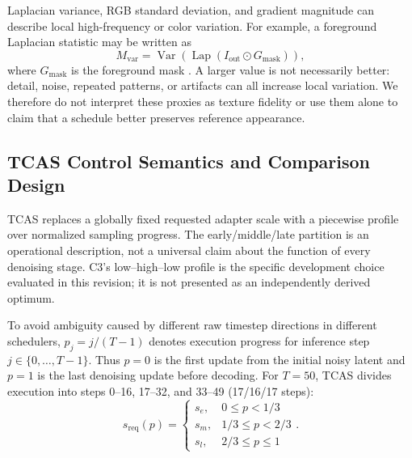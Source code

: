 \documentclass[times,twocolumn,final]{elsarticle}
\providecommand{\DIFadd}[1]{{\protect\color{blue} \sf #1}} %
\providecommand{\DIFaddbegin}{} %
\providecommand{\DIFaddend}{} %
\begin{document}
\DIFaddend Laplacian variance, RGB standard deviation, and gradient magnitude   \DIFaddbegin \DIFadd{can describe local }\DIFaddend high-frequency  
 \DIFaddbegin \DIFadd{or color variation. For example, a foreground Laplacian statistic may be written as
}\begin{equation}
M_{\mathrm{var}}=\operatorname{Var}\!\left(\operatorname{Lap}(I_{\mathrm{out}}\odot G_{\mathrm{mask}})\right),
\end{equation}\DIFaddend 
where   \DIFaddbegin \DIFadd{$G_{\mathrm{mask}}$ is }\DIFaddend the foreground mask  . A larger   \DIFaddbegin \DIFadd{value is not necessarily better: detail, noise, repeated patterns, or artifacts can all increase local variation. We therefore do not interpret these proxies as texture fidelity or use them alone to claim that a schedule better preserves reference appearance}\DIFaddend .

  \DIFaddbegin \subsection{TCAS Control Semantics and Comparison Design}
\DIFaddend \label{subsec:tcas}

  \DIFaddbegin \DIFadd{TCAS }\DIFaddend replaces a globally fixed \DIFaddbegin \DIFadd{requested }\DIFaddend adapter scale with a   \DIFaddbegin \DIFadd{piecewise profile over normalized sampling progress. The early/middle/late partition is an operational description, not a universal claim about the function of every denoising stage. C3's low--high--low profile is the specific development choice evaluated in this revision; it is not presented as an independently derived optimum}\DIFaddend .

To avoid ambiguity caused by different raw timestep directions in different schedulers,   \DIFaddbegin \DIFadd{$p_j=j/(T-1)$ denotes execution progress for inference step $j\in\{0,\ldots,T-1\}$. Thus $p=0$ is the first update from }\DIFaddend the   \DIFaddbegin \DIFadd{initial noisy latent and $p=1$ is the last denoising update before decoding. For $T=50$, TCAS divides execution into steps 0--16, 17--32, and 33--49 (17/16/17 steps):
}\begin{equation}
s_{\mathrm{req}}(p) = \begin{cases} s_e, & 0 \leq p < 1/3 \\ s_m, & 1/3 \leq p < 2/3 \\ s_l, & 2/3 \leq p \leq 1 \end{cases}.
\label{eq:tcas}
\end{equation}\DIFaddend 
\end{document}
